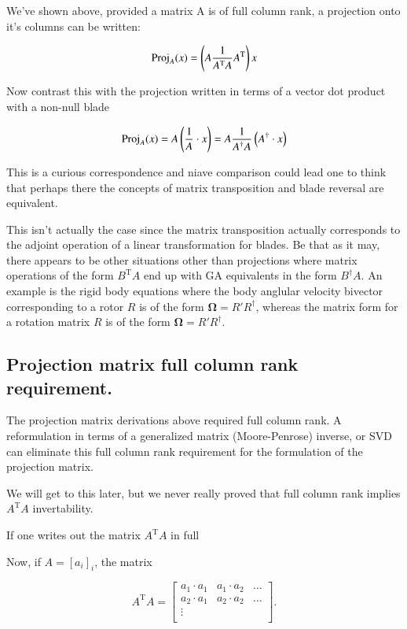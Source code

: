\documentclass{article}      %
\newcommand{\T}[0]{\text{T}}
\newcommand{\BOmega}[0]{\boldsymbol{\Omega}}
\begin{document}
We've shown above, provided a matrix A is of full column rank, a projection onto it's columns can be written:

\[
\Proj_A(x) = \left( A \frac{1}{A^\T A} A^\T \right) x
\]

Now contrast this with the projection written in terms of a vector dot product with a non-null blade 

\[
\operatorname{Proj}_A(x) = A \left(\frac{1}{A} \cdot x\right) = A \frac{1}{A^\dagger A} \left(A^\dagger \cdot x\right)
\]

This is a curious correspondence and niave comparison could lead one to think that perhaps there the concepts of matrix
transposition and blade reversal are equivalent.

This isn't actually the case since the matrix transposition actually corresponds to
the adjoint operation of a linear transformation for blades.  Be that as it may, there appears to be other situations
other than projections where matrix operations of the form $B^\T A$ end up with GA equivalents in the form $B^\dagger A$.  An example
is the rigid body equations where the body anglular velocity bivector corresponding to a rotor $R$ is of the form $\BOmega = R' R^\dagger$, whereas the matrix
form for a rotation matrix $R$ is of the form $\BOmega = R' R^\dagger$.

\subsection{ Projection matrix full column rank requirement. }

The projection matrix derivations above required full column rank.  A reformulation in terms
of a generalized matrix (Moore-Penrose) inverse, or SVD can eliminate this full column rank requirement for
the formulation of the projection matrix.

We will get to this later, but we never really proved that
full column rank implies $A^\T A$ invertability.

If one writes out the matrix $A^\T A$ in full

Now, if $A = [a_i]_i$, the matrix

\begin{equation}\label{eqn:AtA}
A^\T A
=
\begin{bmatrix}
{a_1} \cdot {a_1} & {a_1} \cdot {a_2} & \hdots \\
{a_2} \cdot {a_1} & {a_2} \cdot {a_2} & \hdots \\
\vdots & & \\
\end{bmatrix}.
\end{equation}
\end{document}
